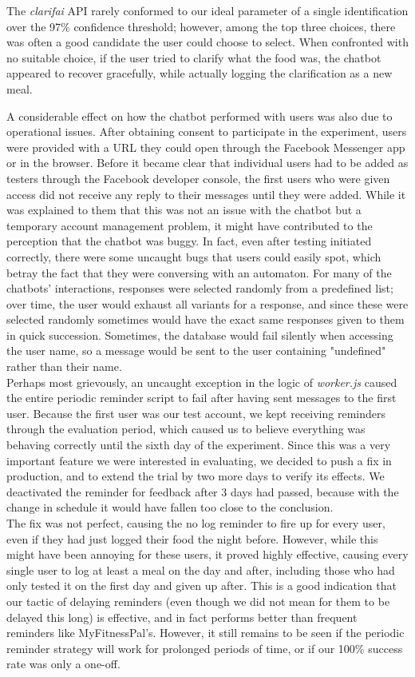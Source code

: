 The \textit{clarifai} API rarely conformed to our ideal parameter of a single identification over the 97\% confidence threshold; however, among the top three choices, there was often a good candidate the user could choose to select. When confronted with no suitable choice, if the user tried to clarify what the food was, the chatbot appeared to recover gracefully, while actually logging the clarification as a new meal. 

A considerable effect on how the chatbot performed with users was also due to operational issues. After obtaining consent to participate in the experiment, users were provided with a URL they could open through the Facebook Messenger app or in the browser. Before it became clear that individual users had to be added as testers through the Facebook developer console, the first users who were given access did not receive any reply to their messages until they were added. While it was explained to them that this was not an issue with the chatbot but a temporary account management problem, it might have contributed to the perception that the chatbot was buggy. In fact, even after testing initiated correctly, there were some uncaught bugs that users could easily spot, which betray the fact that they were conversing with an automaton. For many of the chatbots' interactions, responses were selected randomly from a predefined list; over time, the user would exhaust all variants for a response, and since these were selected randomly sometimes would have the exact same responses given to them in quick succession. Sometimes, the database would fail silently when accessing the user name, so a message would be sent to the user containing "undefined" rather than their name. \\
Perhaps most grievously, an uncaught exception in the logic of \textit{worker.js} caused the entire periodic reminder script to fail after having sent messages to the first user. Because the first user was our test account, we kept receiving reminders through the evaluation period, which caused us to believe everything was behaving correctly until the sixth day of the experiment. Since this was a very important feature we were interested in evaluating, we decided to push a fix in production, and to extend the trial by two more days to verify its effects. We deactivated the reminder for feedback after 3 days had passed, because with the change in schedule it would have fallen too close to the conclusion. \\
The fix was not perfect, causing the no log reminder to fire up for every user, even if they had just logged their food the night before. However, while this might have been annoying for these users, it proved highly effective, causing every single user to log at least a meal on the day and after, including those who had only tested it on the first day and given up after. This is a good indication that our tactic of delaying reminders (even though we did not mean for them to be delayed this long) is effective, and in fact performs better than frequent reminders like MyFitnessPal's. However, it still remains to be seen if the periodic reminder strategy will work for prolonged periods of time, or if our 100\% success rate was only a one-off.\\
